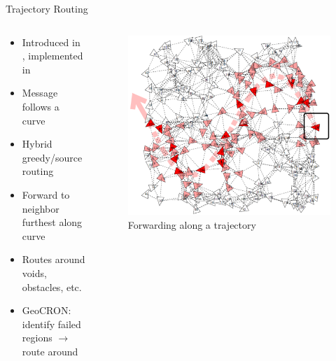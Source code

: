 \documentclass[pdftex]{beamer}
\begin{document}
\begin{frame}{Trajectory Routing}
\begin{columns}
\begin{column}{.5\textwidth}
	\begin{itemize}
		\item Introduced in \cite{Niculescu2003, Niculescu2004}, implemented in \cite{Yuksel2006}
		\item Message follows a curve
		\item Hybrid greedy/source routing
		\item Forward to neighbor furthest along curve
		\item Routes around voids, obstacles, etc.
		\item GeoCRON: identify failed regions $\rightarrow$ route around
	\end{itemize}
\end{column}
	
\begin{column}{.5\textwidth}
\begin{figure}
\includegraphics[width=\textwidth]{trajectory}
\caption{Forwarding along a trajectory}
\end{figure}
\end{column}
\end{columns}
\end{frame}

\end{document}
